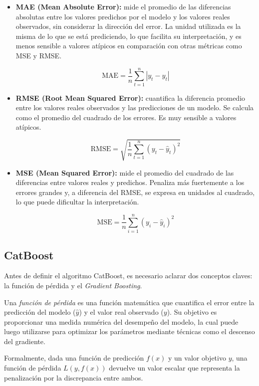 \begin{itemize}
    \item \textbf{MAE (Mean Absolute Error):} mide el promedio de las diferencias absolutas entre los valores predichos por el modelo y los valores reales observados, sin considerar la dirección del error. La unidad utilizada es la misma de lo que se está prediciendo, lo que facilita su interpretación, y es menos sensible a valores atípicos en comparación con otras métricas como MSE y RMSE.
    
    \[
        \mbox{MAE} = \frac{1}{n} \sum_{t=1}^{n} \left| y_t - \hat{y}_t \right|
    \]

    \item \textbf{RMSE (Root Mean Squared Error):} cuantifica la diferencia promedio entre los valores reales observados y las predicciones de un modelo. Se calcula como el promedio del cuadrado de los errores. Es muy sensible a valores atípicos.
    
    \[
        \mbox{RMSE} = \sqrt{ \frac{1}{n} \sum_{t=1}^{n} \left( y_t - \hat{y}_t \right)^2 }
    \]

    \item \textbf{MSE (Mean Squared Error):} mide el promedio del cuadrado de las diferencias entre valores reales y predichos. Penaliza más fuertemente a los errores grandes y, a diferencia del RMSE, se expresa en unidades al cuadrado, lo que puede dificultar la interpretación.
    
    \[
        \mbox{MSE} = \frac{1}{n} \sum_{i=1}^{n} (y_i - \hat{y}_i)^2
    \]
\end{itemize}

\subsection{CatBoost}

Antes de definir el algoritmo CatBoost, es necesario aclarar dos conceptos claves: la función de pérdida y el \emph{Gradient Boosting}.

Una \emph{función de pérdida} es una función matemática que cuantifica el error entre la predicción del modelo ($\hat{y}$) y el valor real observado ($y$). Su objetivo es proporcionar una medida numérica del desempeño del modelo, la cual puede luego utilizarse para optimizar los parámetros mediante técnicas como el descenso del gradiente.

Formalmente, dada una función de predicción $f(x)$ y un valor objetivo $y$, una función de pérdida $L(y, f(x))$ devuelve un valor escalar que representa la penalización por la discrepancia entre ambos.

